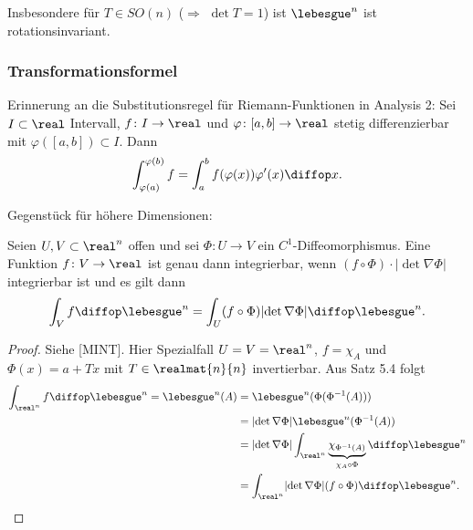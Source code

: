 Insbesondere für $T \in SO(n)$ ($\Rightarrow$ $\det T = 1$) ist $\lebesgue^n$ ist rotationsinvariant.

\clearpage

\subsubsection{Transformationsformel}
Erinnerung an die Substitutionsregel für Riemann-Funktionen in Analysis 2: Sei $I \subset \real$ Intervall, $f\colon I \to \real$ und $\varphi\colon[a,b] \to \real$ stetig differenzierbar mit $\varphi([a,b]) \subset I$. Dann
\[ \int_{\varphi(a)}^{\varphi(b)} f = \int_a^b f(\varphi(x)) \varphi'(x) \diffop x. \]

Gegenstück für höhere Dimensionen:
\begin{thm}
 Seien $U,V \subset \real^n$ offen und sei $\Phi\colon U \to V$ ein $C^1$-Diffeomorphismus\footnotemark. Eine Funktion $f\colon V \to \real$ ist genau dann integrierbar, wenn $(f \circ \Phi) \cdot \lvert \det \nabla \Phi \rvert$ integrierbar ist und es gilt dann
 \[ \int_V f \diffop \lebesgue^n = \int_U (f \circ \Phi) \lvert {\det \nabla \Phi} \rvert \diffop \lebesgue^n. \]
\end{thm}

\begin{proof}
 Siehe [MINT]. Hier Spezialfall $U=V=\real^n$, $f = \chi_A$ und $\Phi(x) = a + Tx$ mit $T \in \realmat{n}{n}$ invertierbar. Aus Satz 5.4 folgt
 \begin{align*}
    \int_{\real^n} f \diffop \lebesgue^n = \lebesgue^n(A)
    &= \lebesgue^n ( \Phi( \Phi^{-1}( A ) )) \\
    &= \lvert \det \nabla \Phi \rvert \lebesgue^n( \Phi^{-1}(A) ) \\
    &= \lvert \det \nabla \Phi \rvert \int_{\real^n} \underbrace{\chi_{\Phi^{-1}(A)}}_{\chi_A \circ \Phi} \diffop \lebesgue^n \\
    &= \int_{\real^n} \lvert \det\nabla \Phi \rvert (f \circ \Phi) \diffop \lebesgue^n. \qedhere
 \end{align*}
\end{proof}

